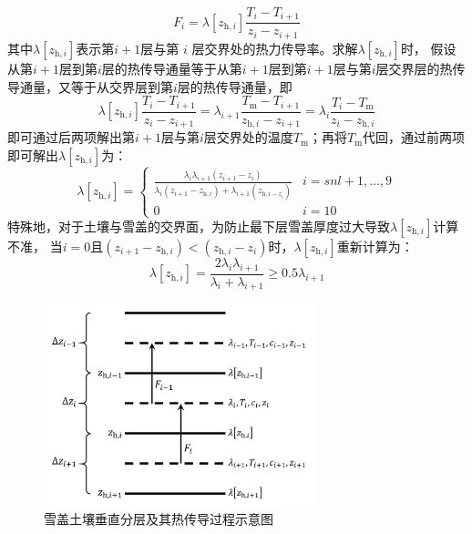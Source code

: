 \begin{equation}
  F_{i}=\lambda\left[z_{\mathrm{h},i}\right] \frac{T_{i}-T_{i+1}}{z_{i}-z_{i+1}}
\end{equation}
其中$\lambda\left[z_{\mathrm{h},i}\right]$表示第$i+1$层与第 $i$ 层交界处的热力传导率。求解$\lambda\left[z_{\mathrm{h},i}\right]$时，
假设从第$i+1$层到第$i$层的热传导通量等于从第$i+1$层到第$i+1$层与第$i$层交界层的热传导通量，又等于从交界层到第$i$层的热传导通量，即
\begin{equation}
  \lambda\left[z_{\mathrm{h},i}\right] \frac{T_{i}-T_{i+1}}{z_{i}-z_{i+1}}=\lambda_{i+1} \frac{T_{\mathrm{m}}-T_{i+1}}{z_{\mathrm{h},i}-z_{i+1}}=\lambda_{i} \frac{T_{i}-T_{\mathrm{m}}}{z_{i}-z_{\mathrm{h},i}}
\end{equation}
即可通过后两项解出第$i+1$层与第$i$层交界处的温度$T_{\mathrm {m}} $；再将$T_{\mathrm {m}} $代回，通过前两项即可解出$\lambda\left[z_{\mathrm{h},i}\right]$为：
\begin{equation}
  \lambda\left[z_{\mathrm{h},i}\right]=\begin{cases}
    \frac{\lambda_{i} \lambda_{i+1}\left(z_{i+1}-z_{i}\right)}{\lambda_{i}\left(z_{i+1} - z_{\mathrm{h},i}\right)+\lambda_{i+1}\left(z_{\mathrm{h},i - z_{i}}\right)} & i=snl+1, \ldots, 9 \\
    0 & i=10
  \end{cases}
\end{equation}
特殊地，对于土壤与雪盖的交界面，为防止最下层雪盖厚度过大导致$\lambda\left[z_{\mathrm{h},i}\right]$计算不准，
当$i=0$且$\left(z_{i+1}-z_{\mathrm{h},i}\right)<\left(z_{\mathrm{h},i}-z_i\right)$时，$\lambda\left[z_{\mathrm{h},i}\right]$重新计算为：
\begin{equation}
  \lambda\left[z_{\mathrm{h},i}\right]=\frac{2 \lambda_{i} \lambda_{i+1}}{\lambda_{i}+\lambda_{i+1}} \geqslant 0.5 \lambda_{i+1}
\end{equation}
{
  \begin{figure}[htbp]
    \centering
    \includegraphics[width=0.7\textwidth]{Figures/雪盖土壤热力过程/雪盖土壤垂直分层及其热传导过程示意图_v2.png}
    \caption{雪盖土壤垂直分层及其热传导过程示意图}
    \label{fig:雪盖土壤垂直分层及其热传导过程示意图}
  \end{figure}
}


